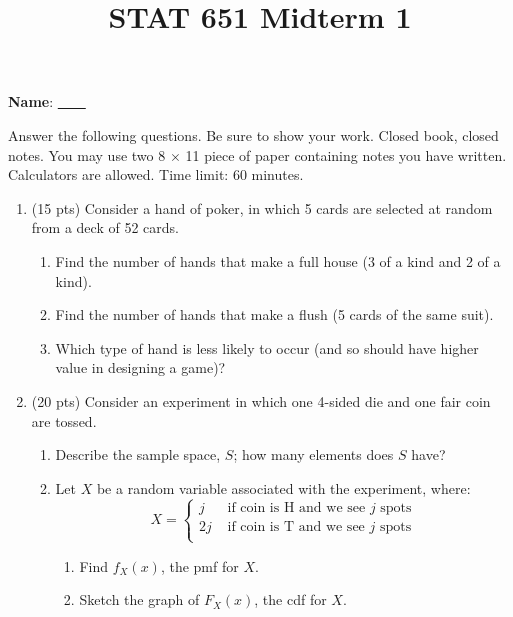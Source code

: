 \documentclass[12pt]{article}
\begin{document}
\title{STAT 651 Midterm 1}
\author{}
\maketitle

\textbf{Name}: \underline{\ \ \hskip8cm\ \ }
\medskip

Answer the following questions.  Be sure to show your work. 
Closed book, closed notes.  You may use two 8 $\times$ 11 piece of
paper containing notes you have written.
Calculators are allowed.
Time limit: 60 minutes.
\medskip

\begin{enumerate}

\item(15 pts)  Consider a hand of poker, in which 5 cards are selected at random from a deck of 52 cards.
  \begin{enumerate}
  \item Find the number of hands that make a full house (3 of a kind and 2 of a kind).
  \item Find the number of hands that make a flush (5 cards of the same suit).
  \item Which type of hand is less likely to occur (and so should have higher value
    in designing a game)?
  \end{enumerate}

\item(20 pts)  Consider an experiment in which one 4-sided die and one fair coin are tossed.
  \begin{enumerate}
  \item Describe the sample space, $S$; how many elements does $S$ have?
  \item Let $X$ be a random variable associated with the experiment, where:
  $$X = \left\{ \begin{array}{ll}
  j & {\mbox{ if coin is H and we see }} j {\mbox{ spots}} \\
  2j & {\mbox{ if coin is T and we see }} j {\mbox{ spots}} \\
  \end{array}\right.$$
    \begin{enumerate}
    \item Find $f_X(x)$, the pmf for $X$.
    \item Sketch the graph of $F_X(x)$, the cdf for $X$.
    \end{enumerate}
  \end{enumerate}
  

\end{enumerate}
\end{document}
